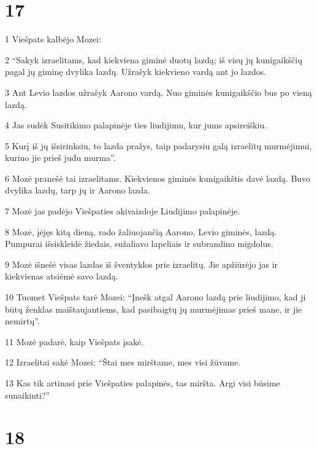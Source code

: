 \chapter{17}


\par 1 Viešpats kalbėjo Mozei: 
\par 2 “Sakyk izraelitams, kad kiekviena giminė duotų lazdą; iš visų jų kunigaikščių pagal jų giminę dvylika lazdų. Užrašyk kiekvieno vardą ant jo lazdos. 
\par 3 Ant Levio lazdos užrašyk Aarono vardą. Nuo giminės kunigaikščio bus po vieną lazdą. 
\par 4 Jas sudėk Susitikimo palapinėje ties liudijimu, kur jums apsireiškiu. 
\par 5 Kurį iš jų išsirinksiu, to lazda pražys, taip padarysiu galą izraelitų murmėjimui, kuriuo jie prieš judu murma”. 
\par 6 Mozė pranešė tai izraelitams. Kiekvienos giminės kunigaikštis davė lazdą. Buvo dvylika lazdų, tarp jų ir Aarono lazda. 
\par 7 Mozė jas padėjo Viešpaties akivaizdoje Liudijimo palapinėje. 
\par 8 Mozė, įėjęs kitą dieną, rado žaliuojančią Aarono, Levio giminės, lazdą. Pumpurai išsiskleidė žiedais, sužaliavo lapeliais ir subrandino migdolus. 
\par 9 Mozė išnešė visas lazdas iš šventyklos prie izraelitų. Jie apžiūrėjo jas ir kiekvienas atsiėmė savo lazdą. 
\par 10 Tuomet Viešpats tarė Mozei: “Įnešk atgal Aarono lazdą prie liudijimo, kad ji būtų ženklas maištaujantiems, kad pasibaigtų jų murmėjimas prieš mane, ir jie nemirtų”. 
\par 11 Mozė padarė, kaip Viešpats įsakė. 
\par 12 Izraelitai sakė Mozei: “Štai mes mirštame, mes visi žūvame. 
\par 13 Kas tik artinasi prie Viešpaties palapinės, tas miršta. Argi visi būsime sunaikinti?”



\chapter{18}


